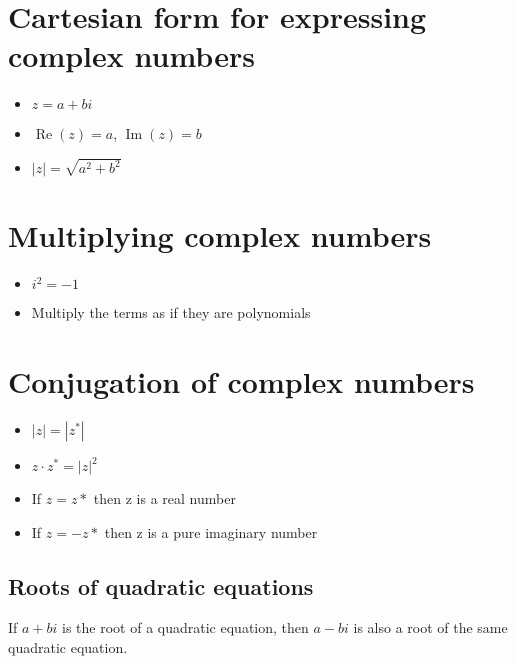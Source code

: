 \section{Cartesian form for expressing complex numbers}
\begin{itemize}
    \item $z=a+bi$
    \item $\operatorname{Re}(z) = a$, $\operatorname{Im}(z) = b$
    \item $|z|=\sqrt{a^2+b^2}$
\end{itemize}

\section{Multiplying complex numbers}
\begin{itemize}
    \item $i^2 = -1$
    \item Multiply the terms as if they are polynomials
\end{itemize}

\section{Conjugation of complex numbers}
\begin{itemize}
    \item $|z|=|z^*|$
    \item $z\cdot z^*= |z|^2$
    \item If $z=z*$ then z is a real number
    \item If $z=-z*$ then z is a pure imaginary number
\end{itemize}
\subsection{Roots of quadratic equations}
If $a+bi$ is the root of a quadratic equation, then $a-bi$ is also a root of the same quadratic equation.